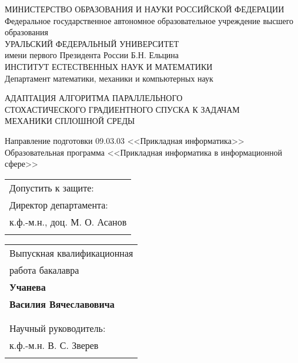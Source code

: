 \documentclass[12pt]{report}
\begin{document}
  \pagestyle{empty} %
  \begin{center}
    \small
    МИНИСТЕРСТВО ОБРАЗОВАНИЯ И НАУКИ РОССИЙСКОЙ ФЕДЕРАЦИИ\\
    Федеральное государственное автономное образовательное учреждение высшего образования\\
    УРАЛЬСКИЙ ФЕДЕРАЛЬНЫЙ УНИВЕРСИТЕТ \\
    имени первого Президента России Б.Н. Ельцина\\
    \vspace{1em}
    ИНСТИТУТ ЕСТЕСТВЕННЫХ НАУК И МАТЕМАТИКИ\\
    Департамент математики, механики и компьютерных наук
  \end{center}

  \vspace{1em}

  \begin{center}
    \large
    АДАПТАЦИЯ АЛГОРИТМА ПАРАЛЛЕЛЬНОГО\\ СТОХАСТИЧЕСКОГО ГРАДИЕНТНОГО СПУСКА К ЗАДАЧАМ\\ МЕХАНИКИ СПЛОШНОЙ СРЕДЫ
    \vspace{1em}

    \normalsize
    Направление подготовки 09.03.03 <<Прикладная информатика>>\\
    \vspace{1em}
    Образовательная программа <<Прикладная информатика в информационной сфере>>
    \end{center}
  \vspace{1em}

  \begin{tabular}[t]{@{}l}
    Допустить к защите:\\
    Директор департамента:\\ к.ф.-м.н., доц. М. О. Асанов\\
    \underline{\hspace{5cm}}\\
  \end{tabular}
  \hfill
  \begin{tabular}[t]{l@{}}
      Выпускная квалификационная\\работа бакалавра\\
      \textbf{Учанева}\\
      \textbf{Василия Вячеславовича}\\
      \underline{\hspace{5cm}}\\
      \vspace{1em}\\
      Научный руководитель:\\ к.ф.-м.н. В. С. Зверев\\
      \underline{\hspace{5cm}}\\
  \end{tabular}
\end{document}

